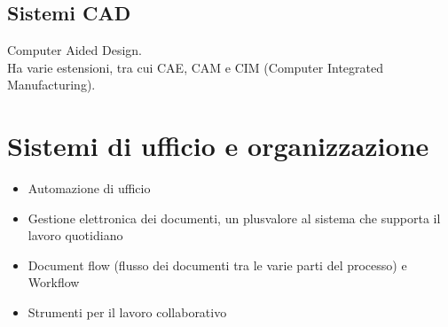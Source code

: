 \subsection{Sistemi CAD}
\label{sub:Sistemi CAD}
Computer Aided Design.\\
Ha varie estensioni, tra cui CAE, CAM e CIM (Computer Integrated Manufacturing).
\section{Sistemi di ufficio e organizzazione}
\label{sec:Sistemi di ufficio e organizzazione}
\begin{itemize}
  \item Automazione di ufficio
  \item Gestione elettronica dei documenti, un plusvalore al sistema che supporta il lavoro quotidiano
  \item Document flow (flusso dei documenti tra le varie parti del processo) e Workflow
  \item Strumenti per il lavoro collaborativo
\end{itemize}
